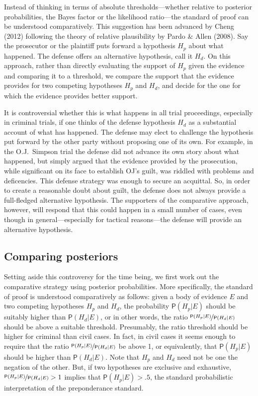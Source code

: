 \documentclass[
  10pt,
  dvipsnames,enabledeprecatedfontcommands]{scrartcl}
\newcommand{\pr}[1]{\ensuremath{\mathsf{P}(#1)}}
\begin{document}
Instead of thinking in terms of absolute thresholds---whether relative
to posterior probabilities, the Bayes factor or the likelihood
ratio---the standard of proof can be understood comparatively. This
suggestion has been advanced by Cheng (2012) following the theory of
relative plausibility by Pardo \& Allen (2008). Say the prosecutor or
the plaintiff puts forward a hypothesis \(H_p\) about what happened. The
defense offers an alternative hypothesis, call it \(H_d\). On this
approach, rather than directly evaluating the support of \(H_p\) given
the evidence and comparing it to a threshold, we compare the support
that the evidence provides for two competing hypotheses \(H_p\) and
\(H_d\), and decide for the one for which the evidence provides better
support.

It is controversial whether this is what happens in all trial
proceedings, especially in criminal trials, if one thinks of the defense
hypothesis \(H_d\) as a substantial account of what has happened. The
defense may elect to challenge the hypothesis put forward by the other
party without proposing one of its own. For example, in the O.J.~Simpson
trial the defense did not advance its own story about what happened, but
simply argued that the evidence provided by the prosecution, while
significant on its face to establish OJ's guilt, was riddled with
problems and deficencies. This defense strategy was enough to secure an
acquittal. So, in order to create a reasonable doubt about guilt, the
defense does not always provide a full-fledged alternative hypothesis.
The supporters of the comparative approach, however, will respond that
this could happen in a small number of cases, even though in
general---especially for tactical reasons---the defense will provide an
alternative hypothesis.

\hypertarget{comparing-posteriors}{%
\subsection{Comparing posteriors}\label{comparing-posteriors}}

Setting aside this controversy for the time being, we first work out the
comparative strategy using posterior probabilities. More specifically,
the standard of proof is understood comparatively as follows: given a
body of evidence \(E\) and two competing hypotheses \(H_p\) and \(H_d\),
the probability \(\pr{H_p \vert E}\) should be suitably higher than
\(\pr{H_d \vert E}\), or in other words, the ratio
\(\nicefrac{\pr{H_p \vert E}}{\pr{H_d \vert E}}\) should be above a
suitable threshold. Presumably, the ratio threshold should be higher for
criminal than civil cases. In fact, in civil cases it seems enough to
require that the ratio \(\nicefrac{\pr{H_p \vert E}}{\pr{H_d \vert E}}\)
be above 1, or equivalently, that \(\pr{H_p \vert E}\) should be higher
than \(\pr{H_d \vert E}\). Note that \(H_p\) and \(H_d\) need not be one
the negation of the other. But, if two hypotheses are exclusive and
exhaustive, \(\nicefrac{\pr{H_p \vert E}}{\pr{H_d \vert E}}>1\) implies
that \(\pr{H_p \vert E}>.5\), the standard probabilistic interpretation
of the preponderance standard.
\end{document}
